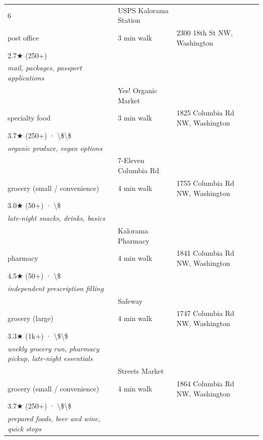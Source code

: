 \documentclass[11pt,a4paper]{article}
\begin{document}
{\begin{longtable}{@{}p{0.5cm}p{6.5cm}p{2.5cm}p{6.5cm}@{}}
6 & USPS Kalorama Station \\ \textcolor{brandmuted}{\footnotesize post office} & 3 min walk & \textcolor{brandmuted}{\footnotesize 2300 18th St NW,  Washington} \\ 2.7★ (250+) \\ \textit{mail, packages, passport applications} \\
\addlinespace[2pt]
7 & Yes! Organic Market \\ \textcolor{brandmuted}{\footnotesize specialty food} & 3 min walk & \textcolor{brandmuted}{\footnotesize 1825 Columbia Rd NW,  Washington} \\ 3.7★ (250+) · \textbackslash{}\$\textbackslash{}\$ \\ \textit{organic produce, vegan options} \\
\addlinespace[2pt]
8 & 7-Eleven Columbia Rd \\ \textcolor{brandmuted}{\footnotesize grocery (small / convenience)} & 4 min walk & \textcolor{brandmuted}{\footnotesize 1755 Columbia Rd NW,  Washington} \\ 3.0★ (50+) · \textbackslash{}\$ \\ \textit{late-night snacks, drinks, basics} \\
\addlinespace[2pt]
9 & Kalorama Pharmacy \\ \textcolor{brandmuted}{\footnotesize pharmacy} & 4 min walk & \textcolor{brandmuted}{\footnotesize 1841 Columbia Rd NW,  Washington} \\ 4.5★ (50+) · \textbackslash{}\$ \\ \textit{independent prescription filling} \\
\addlinespace[2pt]
10 & Safeway \\ \textcolor{brandmuted}{\footnotesize grocery (large)} & 4 min walk & \textcolor{brandmuted}{\footnotesize 1747 Columbia Rd NW,  Washington} \\ 3.3★ (1k+) · \textbackslash{}\$\textbackslash{}\$ \\ \textit{weekly grocery run, pharmacy pickup, late-night essentials} \\
\addlinespace[2pt]
11 & Streets Market \\ \textcolor{brandmuted}{\footnotesize grocery (small / convenience)} & 4 min walk & \textcolor{brandmuted}{\footnotesize 1864 Columbia Rd NW,  Washington} \\ 3.7★ (250+) · \textbackslash{}\$\textbackslash{}\$ \\ \textit{prepared foods, beer and wine, quick stops} \\

\end{longtable}}
\end{document}
